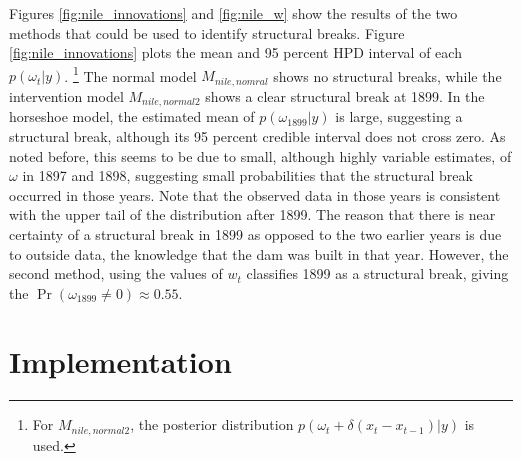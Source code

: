 \documentclass{article}
\DeclareMathOperator{\E}{E}
\begin{document}
Figures \ref{fig:nile_innovations} and \ref{fig:nile_w} show the results of the two methods that could be used to identify structural breaks. 
Figure \ref{fig:nile_innovations} plots the mean and 95 percent HPD interval of each $p(\omega_{t} | y)$.%
\footnote{For $M_{nile,normal2}$, the posterior distribution $p(\omega_{t} + \delta (x_{t} - x_{t-1}) | y)$ is used.}
The normal model $M_{nile,nomral}$ shows no structural breaks, while the intervention model $M_{nile,normal2}$ shows a clear structural break at 1899.
In the horseshoe model, the estimated mean of $p(\omega_{1899} | y)$ is large, suggesting a structural break, although its 95 percent credible interval does not cross zero.
As noted before, this seems to be due to small, although highly variable estimates, of $\omega$ in 1897 and 1898, suggesting small probabilities that the structural break occurred in those years.
Note that the observed data in those years is consistent with the upper tail of the distribution after 1899.
The reason that there is near certainty of a structural break in 1899 as opposed to the two earlier years is due to outside data, the knowledge that the dam was built in that year.
However, the second method, using the values of $w_{t}$ classifies 1899 as a structural break, giving the $\Pr(\omega_{1899} \neq 0) \approx 0.55$.



%   

\section{Implementation}
\label{sec:implementation}

\end{document}
